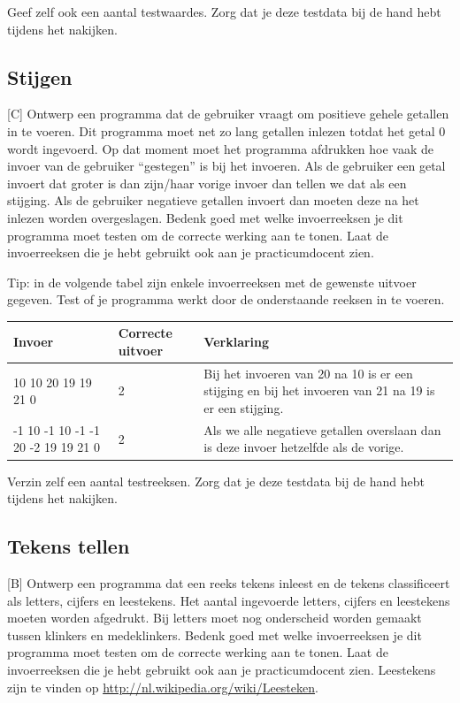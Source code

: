 \documentclass[a4paper,10pt,fleqn,twoside]{article}
\begin{document}
Geef zelf ook een aantal testwaardes. Zorg dat je deze testdata bij de hand hebt tijdens het nakijken.

\subsection{Stijgen}[C]
Ontwerp een programma dat de gebruiker vraagt om positieve gehele getallen in te voeren. Dit programma moet net zo lang getallen inlezen totdat het getal 0 wordt ingevoerd. Op dat moment moet het programma afdrukken hoe vaak de invoer van de gebruiker ``gestegen'' is bij het invoeren. Als de gebruiker een getal invoert dat groter is dan zijn/haar vorige invoer dan tellen we dat als een stijging. Als de gebruiker negatieve getallen invoert dan moeten deze na het inlezen worden overgeslagen. Bedenk goed met welke invoerreeksen je dit programma moet testen om de correcte werking aan te tonen. Laat de invoerreeksen die je hebt gebruikt ook aan je practicumdocent zien.

Tip: in de volgende tabel zijn enkele invoerreeksen met de gewenste uitvoer gegeven. Test of je programma werkt door de onderstaande reeksen in te voeren.

\begin{table}[!ht]
\begin{tabular}{|l|p{1.5cm}|p{7.5cm}|}
\hline
Invoer                             & Correcte uitvoer & Verklaring \\ \hline
10 10 20 19 19 21 0                & 2                & Bij het invoeren van 20 na 10 is er een stijging en bij het invoeren van 21 na 19 is er een stijging. \\ \hline
-1 10 -1 10 -1 -1 20 -2 19 19 21 0 & 2                & Als we alle negatieve getallen overslaan dan is deze invoer hetzelfde als de vorige. \\ \hline                                                          
\end{tabular}
\end{table}

Verzin zelf een aantal testreeksen. Zorg dat je deze testdata bij de hand hebt tijdens het nakijken.

\subsection{Tekens tellen}[B]
Ontwerp een programma dat een reeks tekens inleest en de tekens classificeert als letters, cijfers en leestekens. Het aantal ingevoerde letters, cijfers en leestekens moeten worden afgedrukt. Bij letters moet nog onderscheid worden gemaakt tussen klinkers en medeklinkers. Bedenk goed met welke invoerreeksen je dit programma moet testen om de correcte werking aan te tonen. Laat de invoerreeksen die je hebt gebruikt ook aan je practicumdocent zien. Leestekens zijn te vinden op \url{http://nl.wikipedia.org/wiki/Leesteken}.
\end{document}
